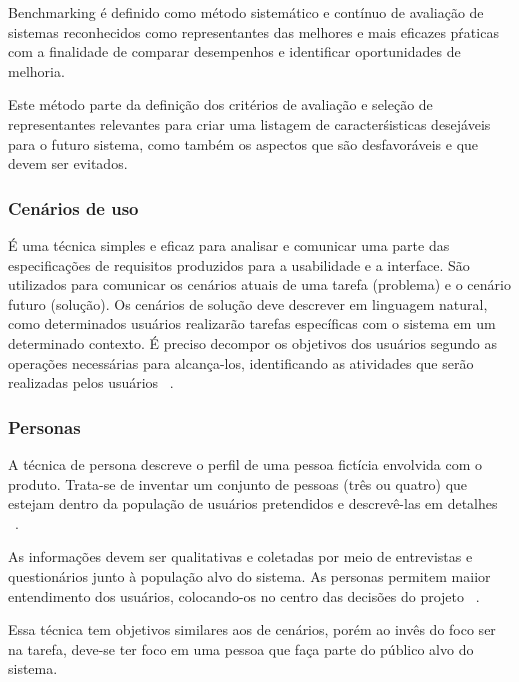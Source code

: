 	Benchmarking é definido como método sistemático e contínuo de avaliação de sistemas reconhecidos como representantes das melhores e mais eficazes pŕaticas com a finalidade de comparar desempenhos e identificar oportunidades de melhoria. ~\cite{spendolini1994}

	Este método parte da definição dos critérios de avaliação e seleção de representantes relevantes para criar uma listagem de caracterśisticas desejáveis para o futuro sistema, como também os aspectos que são desfavoráveis e que devem ser evitados.

\subsubsection{Cenários de uso}

	É uma técnica simples e eficaz para analisar e comunicar uma parte das especificações de requisitos produzidos para a usabilidade e a interface. São utilizados para comunicar os cenários atuais de uma tarefa (problema) e o cenário futuro (solução). Os cenários de solução deve descrever em linguagem natural, como determinados usuários realizarão tarefas específicas com o sistema em um determinado contexto. É preciso decompor os objetivos dos usuários segundo as operações necessárias para alcança-los, identificando as atividades que serão realizadas pelos usuários ~\cite{cybis2010}.

\subsubsection{Personas}

	A técnica de persona descreve o perfil de uma pessoa fictícia envolvida com o produto. Trata-se de inventar um conjunto de pessoas (três ou quatro) que estejam dentro da população de usuários pretendidos e descrevê-las em detalhes ~\cite{cybis2010}.

	As informações devem ser qualitativas e coletadas por meio de entrevistas e questionários junto à população alvo do sistema. As personas permitem maiior entendimento dos usuários, colocando-os no centro das decisões do projeto ~\cite{cybis2010}.

	Essa técnica tem objetivos similares aos de cenários, porém ao invês do foco ser na tarefa, deve-se ter foco em uma pessoa que faça parte do público alvo do sistema.



